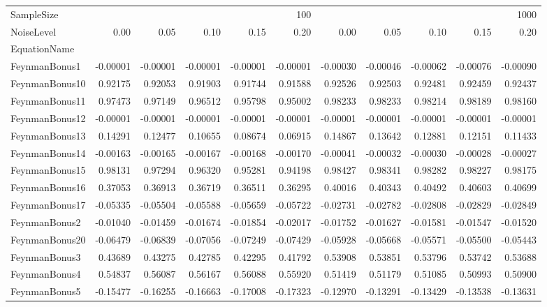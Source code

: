 \begin{tabular}{lrrrrrrrrrr}
\toprule
SampleSize & \multicolumn{5}{r}{100} & \multicolumn{5}{r}{1000} \\
NoiseLevel & 0.00 & 0.05 & 0.10 & 0.15 & 0.20 & 0.00 & 0.05 & 0.10 & 0.15 & 0.20 \\
EquationName &  &  &  &  &  &  &  &  &  &  \\
\midrule
FeynmanBonus1 & -0.00001 & -0.00001 & -0.00001 & -0.00001 & -0.00001 & -0.00030 & -0.00046 & -0.00062 & -0.00076 & -0.00090 \\
FeynmanBonus10 & 0.92175 & 0.92053 & 0.91903 & 0.91744 & 0.91588 & 0.92526 & 0.92503 & 0.92481 & 0.92459 & 0.92437 \\
FeynmanBonus11 & 0.97473 & 0.97149 & 0.96512 & 0.95798 & 0.95002 & 0.98233 & 0.98233 & 0.98214 & 0.98189 & 0.98160 \\
FeynmanBonus12 & -0.00001 & -0.00001 & -0.00001 & -0.00001 & -0.00001 & -0.00001 & -0.00001 & -0.00001 & -0.00001 & -0.00001 \\
FeynmanBonus13 & 0.14291 & 0.12477 & 0.10655 & 0.08674 & 0.06915 & 0.14867 & 0.13642 & 0.12881 & 0.12151 & 0.11433 \\
FeynmanBonus14 & -0.00163 & -0.00165 & -0.00167 & -0.00168 & -0.00170 & -0.00041 & -0.00032 & -0.00030 & -0.00028 & -0.00027 \\
FeynmanBonus15 & 0.98131 & 0.97294 & 0.96320 & 0.95281 & 0.94198 & 0.98427 & 0.98341 & 0.98282 & 0.98227 & 0.98175 \\
FeynmanBonus16 & 0.37053 & 0.36913 & 0.36719 & 0.36511 & 0.36295 & 0.40016 & 0.40343 & 0.40492 & 0.40603 & 0.40699 \\
FeynmanBonus17 & -0.05335 & -0.05504 & -0.05588 & -0.05659 & -0.05722 & -0.02731 & -0.02782 & -0.02808 & -0.02829 & -0.02849 \\
FeynmanBonus2 & -0.01040 & -0.01459 & -0.01674 & -0.01854 & -0.02017 & -0.01752 & -0.01627 & -0.01581 & -0.01547 & -0.01520 \\
FeynmanBonus20 & -0.06479 & -0.06839 & -0.07056 & -0.07249 & -0.07429 & -0.05928 & -0.05668 & -0.05571 & -0.05500 & -0.05443 \\
FeynmanBonus3 & 0.43689 & 0.43275 & 0.42785 & 0.42295 & 0.41792 & 0.53908 & 0.53851 & 0.53796 & 0.53742 & 0.53688 \\
FeynmanBonus4 & 0.54837 & 0.56087 & 0.56167 & 0.56088 & 0.55920 & 0.51419 & 0.51179 & 0.51085 & 0.50993 & 0.50900 \\
FeynmanBonus5 & -0.15477 & -0.16255 & -0.16663 & -0.17008 & -0.17323 & -0.12970 & -0.13291 & -0.13429 & -0.13538 & -0.13631 \\

\end{tabular}
